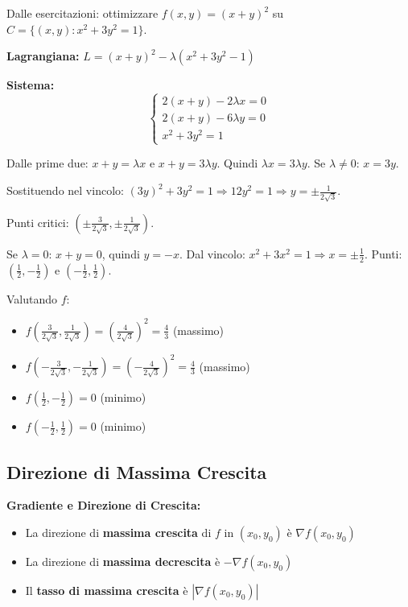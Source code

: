 \begin{esempio}
Dalle esercitazioni: ottimizzare $f(x,y) = (x+y)^2$ su $C = \{(x,y) : x^2 + 3y^2 = 1\}$.

\textbf{Lagrangiana:} $L = (x+y)^2 - \lambda(x^2 + 3y^2 - 1)$

\textbf{Sistema:}
\[ \begin{cases}
2(x+y) - 2\lambda x = 0 \\
2(x+y) - 6\lambda y = 0 \\
x^2 + 3y^2 = 1
\end{cases} \]

Dalle prime due: $x+y = \lambda x$ e $x+y = 3\lambda y$.
Quindi $\lambda x = 3\lambda y$. Se $\lambda \neq 0$: $x = 3y$.

Sostituendo nel vincolo: $(3y)^2 + 3y^2 = 1 \Rightarrow 12y^2 = 1 \Rightarrow y = \pm\frac{1}{2\sqrt{3}}$.

Punti critici: $\left(\pm\frac{3}{2\sqrt{3}}, \pm\frac{1}{2\sqrt{3}}\right)$.

Se $\lambda = 0$: $x+y = 0$, quindi $y = -x$. Dal vincolo: $x^2 + 3x^2 = 1 \Rightarrow x = \pm\frac{1}{2}$.
Punti: $\left(\frac{1}{2}, -\frac{1}{2}\right)$ e $\left(-\frac{1}{2}, \frac{1}{2}\right)$.

Valutando $f$:
\begin{itemize}
    \item $f\left(\frac{3}{2\sqrt{3}}, \frac{1}{2\sqrt{3}}\right) = \left(\frac{4}{2\sqrt{3}}\right)^2 = \frac{4}{3}$ (massimo)
    \item $f\left(-\frac{3}{2\sqrt{3}}, -\frac{1}{2\sqrt{3}}\right) = \left(-\frac{4}{2\sqrt{3}}\right)^2 = \frac{4}{3}$ (massimo)
    \item $f\left(\frac{1}{2}, -\frac{1}{2}\right) = 0$ (minimo)
    \item $f\left(-\frac{1}{2}, \frac{1}{2}\right) = 0$ (minimo)
\end{itemize}
\end{esempio}

\subsection{Direzione di Massima Crescita}

\begin{info}
\textbf{Gradiente e Direzione di Crescita:}
\begin{itemize}
    \item La direzione di \textbf{massima crescita} di $f$ in $(x_0,y_0)$ è $\nabla f(x_0,y_0)$
    \item La direzione di \textbf{massima decrescita} è $-\nabla f(x_0,y_0)$
    \item Il \textbf{tasso di massima crescita} è $|\nabla f(x_0,y_0)|$
\end{itemize}
\end{info}

